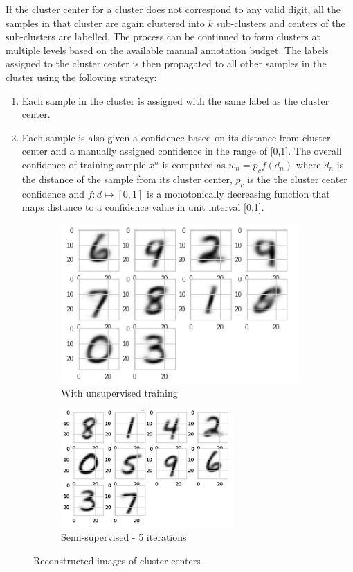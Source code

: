 \documentclass[runningheads]{llncs}
\begin{document}
If the cluster center for a cluster does not correspond to any valid digit, all the samples in that cluster are again clustered into $k$ sub-clusters and  centers of the sub-clusters are labelled.
The process can be continued to form clusters at multiple levels based on the available manual annotation budget.
The labels assigned to the cluster center is then propagated to all other samples in the cluster using the following strategy:
\begin{enumerate}
    \item Each sample in the cluster is assigned with the  same label as the cluster center.
    \item Each sample is also given a confidence based on its distance from cluster center and  a manually assigned confidence in the range of [0,1]. The overall confidence of  training sample $x^n$ is computed as $w_n = p_cf(d_n)$
where $d_n$ is the distance of the sample from its cluster center, $p_c$  is the the cluster center confidence  and $f: d \mapsto [0,1]$ is a monotonically decreasing function that maps distance to a confidence value in unit interval [0,1].
\end{enumerate}

\begin{figure}[!t]
\centering
\begin{subfigure}[t]{.45\textwidth}
  \centering
  \includegraphics[width=.5\linewidth]{cluster_centers_epoch_1_0_gmm.png}
  \caption{With unsupervised training}
  \label{cluster_center_1}
\end{subfigure}\hfill
\begin{subfigure}[t]{.45\textwidth}
  \centering
  \includegraphics[width=.5\linewidth]{cluster_centers_epoch_5_0_gmm.png}
  \caption{Semi-supervised - 5 iterations}
  \label{cluster_center_5}
\end{subfigure}
\caption{Reconstructed images of cluster centers}
\label{cluster_center}
\end{figure}
\end{document}
